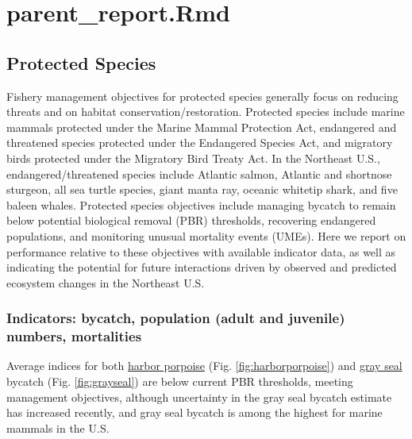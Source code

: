 \documentclass[
  10pt,
]{article}
\begin{document}
\section{parent\_report.Rmd}\label{parent_report.rmd-5}

\subsection{Protected Species}\label{protected-species}

Fishery management objectives for protected species generally focus on reducing threats and on habitat conservation/restoration. Protected species include marine mammals protected under the Marine Mammal Protection Act, endangered and threatened species protected under the Endangered Species Act, and migratory birds protected under the Migratory Bird Treaty Act. In the Northeast U.S., endangered/threatened species include Atlantic salmon, Atlantic and shortnose sturgeon, all sea turtle species, giant manta ray, oceanic whitetip shark, and five baleen whales. Protected species objectives include managing bycatch to remain below potential biological removal (PBR) thresholds, recovering endangered populations, and monitoring unusual mortality events (UMEs). Here we report on performance relative to these objectives with available indicator data, as well as indicating the potential for future interactions driven by observed and predicted ecosystem changes in the Northeast U.S.

\subsubsection{Indicators: bycatch, population (adult and juvenile) numbers, mortalities}\label{indicators-bycatch-population-adult-and-juvenile-numbers-mortalities}

Average indices for both \href{https://noaa-edab.github.io/catalog/harborporpoise.html}{harbor porpoise} (Fig. \ref{fig:harborporpoise}) and \href{https://noaa-edab.github.io/catalog/grayseal.html}{gray seal} bycatch (Fig. \ref{fig:grayseal}) are below current PBR thresholds, meeting management objectives, although uncertainty in the gray seal bycatch estimate has increased recently, and gray seal bycatch is among the highest for marine mammals in the U.S.
\end{document}
